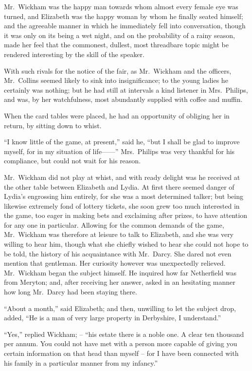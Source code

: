 Mr.\ Wickham was the happy man towards whom almost
every female eye was turned, and Elizabeth was the
happy woman by whom he finally seated himself; and
the agreeable manner in which he immediately fell into
conversation, though it was only on its being a wet night,
and on the probability of a rainy season, made her feel
that the commonest, dullest, most threadbare topic might
be rendered interesting by the skill of the speaker.

With such rivals for the notice of the fair, as Mr.\ Wickham
and the officers, Mr.\ Collins seemed likely to sink
into insignificance; to the young ladies he certainly was
nothing; but he had still at intervals a kind listener in
Mrs.\ Philips, and was, by her watchfulness, most abundantly
supplied with coffee and muffin.

When the card tables were placed, he had an opportunity
of obliging her in return, by sitting down to whist.

“I know little of the game, at present,” said he, “but
I shall be glad to improve myself, for in my situation of
life------” Mrs.\ Philips was very thankful for his compliance,
but could not wait for his reason.

Mr.\ Wickham did not play at whist, and with ready
delight was he received at the other table between Elizabeth
and Lydia. At first there seemed danger of Lydia’s
engrossing him entirely, for she was a most determined
talker; but being likewise extremely fond of lottery
tickets, she soon grew too much interested in the game,
too eager in making bets and exclaiming after prizes, to
have attention for any one in particular. Allowing for
the common demands of the game, Mr.\ Wickham was
therefore at leisure to talk to Elizabeth, and she was very
willing to hear him, though what she chiefly wished to
hear she could not hope to be told, the history of his
acquaintance with Mr.\ Darcy. She dared not even
mention that gentleman. Her curiosity however was
unexpectedly relieved. Mr.\ Wickham began the subject
himself. He inquired how far Netherfield was from
Meryton; and, after receiving her answer, asked in an
hesitating manner how long Mr.\ Darcy had been staying
there.

“About a month,” said Elizabeth; and then, unwilling
to let the subject drop, added, “He is a man of very large
property in Derbyshire, I understand.”

“Yes,” replied Wickham; -- “his estate there is a noble
one. A clear ten thousand per annum. You could not
have met with a person more capable of giving you certain
information on that head than myself -- for I have been
connected with his family in a particular manner from my
infancy.”

